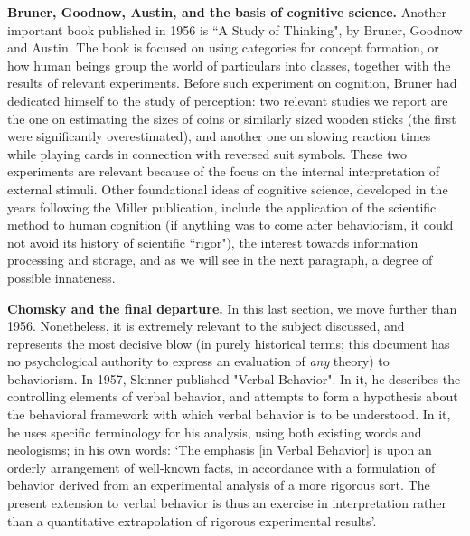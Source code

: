 \documentclass[../main.tex]{subfiles}
\begin{document}
\vspace{4pt}
\textbf{Bruner, Goodnow, Austin, and the basis of cognitive science.}
Another important book published in 1956 is ``A Study of Thinking", by Bruner, Goodnow and Austin. The book is focused on using categories for concept formation, or how human beings group the world of particulars into classes, together with the results of relevant experiments. Before such experiment on cognition, Bruner had dedicated himself to the study of perception: two relevant studies we report are the one on estimating the sizes of coins or similarly sized wooden sticks (the first were significantly overestimated), and another one on slowing reaction times while playing cards in connection with reversed suit symbols. These two experiments are relevant because of the focus on the internal interpretation of external stimuli. Other foundational ideas of cognitive science, developed in the years following the Miller publication, include the application of the scientific method to human cognition (if anything was to come after behaviorism, it could not avoid its history of scientific ``rigor"), the interest towards information processing and storage, and as we will see in the next paragraph, a degree of possible innateness.

\vspace{4pt}
\textbf{Chomsky and the final departure.}
In this last section, we move further than 1956. Nonetheless, it is extremely relevant to the subject discussed, and represents the most decisive blow (in purely historical terms; this document has no psychological authority to express an evaluation of \textit{any} theory) to behaviorism. In 1957, Skinner published "Verbal Behavior". In it, he describes the controlling elements of verbal behavior, and attempts to form a hypothesis about the behavioral framework with which verbal behavior is to be understood. In it, he uses specific terminology for his analysis, using both existing words and neologisms; in his own words: \enquote*{The emphasis [in Verbal Behavior] is upon an orderly arrangement of well-known facts, in accordance with a formulation of behavior derived from an experimental analysis of a more rigorous sort. The present extension to verbal behavior is thus an exercise in interpretation rather than a quantitative extrapolation of rigorous experimental results}\cite{skinnerVerbalBehavior1957}.
\end{document}
